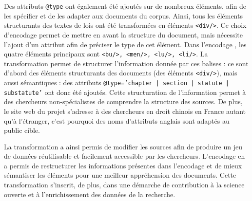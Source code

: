 Des attributs \texttt{@type} ont également été ajoutés sur de nombreux éléments, afin de les spécifier et de les adapter aux documents du corpus. Ainsi, tous les éléments structurants des textes de lois ont été transformées en éléments \TEI \texttt{<div/>}. Ce choix d'encodage permet de mettre en avant la structure du document, mais nécessite l'ajout d'un attribut afin de préciser le type de cet élément. Dans l'encodage \LSC, les quatre éléments principaux sont \texttt{<bu/>, <men/>, <lu/>, <li/>}. La transformation \XSLT permet de structurer l'information donnée par ces balises : ce sont d'abord des éléments structurants des documents (des éléments \texttt{<div/>}), mais aussi sémantiques : des attributs \texttt{@type='chapter | section | statute | substatute'} ont donc été ajoutés. Cette structuration de l'information permet à des chercheurs non-spécialistes de comprendre la structure des sources. De plus, le site web du projet \COREL s'adresse à des chercheurs en droit chinois en France autant qu'à l'étranger, c'est pourquoi des noms d'attributs anglais sont adaptés au public cible.

La transformation \XSLT a ainsi permis de modifier les sources \XML afin de produire un jeu de données réutilisable et facilement accessible par les chercheurs. L'encodage en \TEI a permis de restructurer les informations présentes dans l'encodage et de mieux sémantiser les éléments pour une meilleur appréhension des documents. Cette transformation s'inscrit, de plus, dans une démarche de contribution à la science ouverte et à l'enrichissement des données de la recherche.
